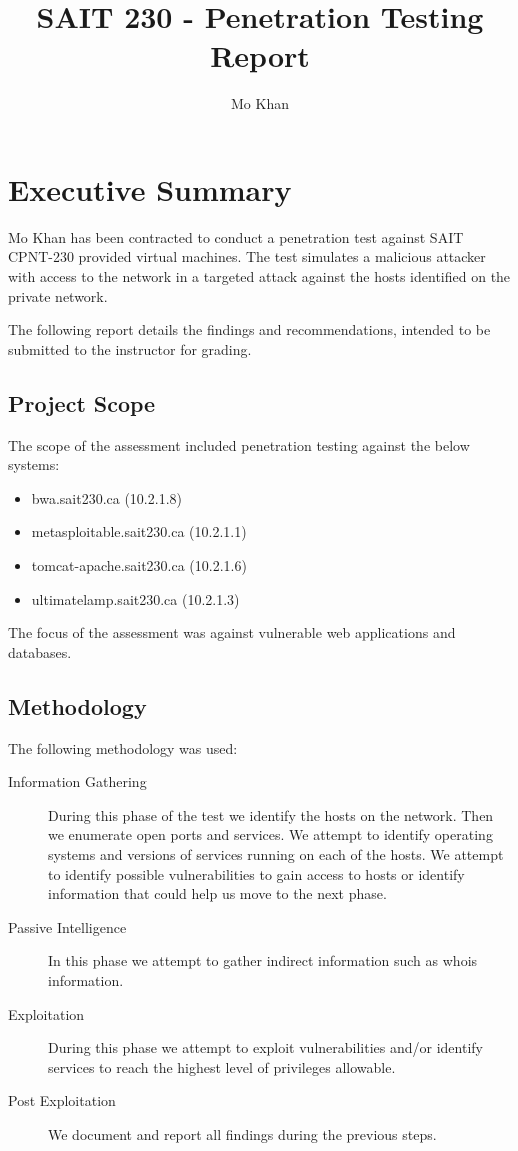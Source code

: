 \documentclass{article}
\title{SAIT 230 - Penetration Testing Report}
\author{Mo Khan}
\begin{document}
\maketitle
\newpage
\tableofcontents
\newpage
{}

\section{Executive Summary}

Mo Khan has been contracted to conduct a penetration test against SAIT CPNT-230 provided
virtual machines. The test simulates a malicious attacker with access to the
network in a targeted attack against the hosts identified on the private network.

The following report details the findings and recommendations, intended to be submitted
to the instructor for grading.

\subsection{Project Scope}

The scope of the assessment included penetration testing against the below systems:

\begin{itemize}
  \item bwa.sait230.ca (10.2.1.8)
  \item metasploitable.sait230.ca (10.2.1.1)
  \item tomcat-apache.sait230.ca (10.2.1.6)
  \item ultimatelamp.sait230.ca (10.2.1.3)
\end{itemize}

The focus of the assessment was against vulnerable web applications and databases.

\subsection{Methodology}

The following methodology was used:

\begin{description}
  \item[Information Gathering] During this phase of the test we identify the hosts on the network. Then we enumerate open ports and services. We attempt to identify operating systems and versions of services running on each of the hosts. We attempt to identify possible vulnerabilities to gain access to hosts or identify information that could help us move to the next phase.
  \item[Passive Intelligence] In this phase we attempt to gather indirect information such as whois information.
  \item[Exploitation] During this phase we attempt to exploit vulnerabilities and/or identify services to reach the highest level of privileges allowable.
  \item[Post Exploitation] We document and report all findings during the previous steps.
\end{description}
\end{document}
